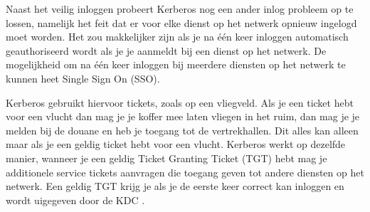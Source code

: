 Naast het veilig inloggen probeert Kerberos nog een ander inlog probleem op te lossen, namelijk het feit dat er voor elke dienst op het netwerk opnieuw ingelogd moet worden. Het zou makkelijker zijn als je na \'e\'en keer inloggen automatisch geauthoriseerd wordt als je je aanmeldt bij een dienst op het netwerk. De mogelijkheid om na \'e\'en keer inloggen bij meerdere diensten op het netwerk te kunnen heet Single Sign On (SSO).

Kerberos gebruikt hiervoor tickets, zoals op een vliegveld. Als je een ticket hebt voor een vlucht dan mag je je koffer mee laten vliegen in het ruim, dan mag je je melden bij de douane en heb je toegang tot de vertrekhallen. Dit alles kan alleen maar als je een geldig ticket hebt voor een vlucht. Kerberos werkt op dezelfde manier, wanneer je een geldig Ticket Granting Ticket (TGT) hebt mag je additionele service tickets aanvragen die toegang geven tot andere diensten op het netwerk. Een geldig TGT krijg je als je de eerste keer correct kan inloggen en wordt uigegeven door de KDC .


